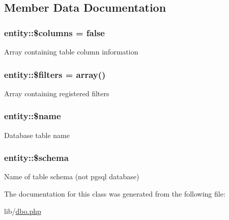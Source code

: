 \subsection{Member Data Documentation}
\hypertarget{classentity_a4d04649f2fb9b66924ce6a0f23633541}{}
\subsubsection[{\$columns}]{\setlength{\rightskip}{0pt plus 5cm}entity\+::\$columns = false}\label{classentity_a4d04649f2fb9b66924ce6a0f23633541}
Array containing table column information \hypertarget{classentity_a59f264aa884262d60bf96c1b750ffba8}{}
\subsubsection[{\$filters}]{\setlength{\rightskip}{0pt plus 5cm}entity\+::\$filters = array()}\label{classentity_a59f264aa884262d60bf96c1b750ffba8}
Array containing registered filters \hypertarget{classentity_ae35f24992703a71e751ed6afa981380f}{}
\subsubsection[{\$name}]{\setlength{\rightskip}{0pt plus 5cm}entity\+::\$name}\label{classentity_ae35f24992703a71e751ed6afa981380f}
Database table name \hypertarget{classentity_a8ce4fa273c17d68fff1dd173a704b109}{}
\subsubsection[{\$schema}]{\setlength{\rightskip}{0pt plus 5cm}entity\+::\$schema}\label{classentity_a8ce4fa273c17d68fff1dd173a704b109}
Name of table schema (not pgsql database) 

The documentation for this class was generated from the following file\+:\begin{DoxyCompactItemize}
\item 
lib/\hyperlink{dbo_8php}{dbo.\+php}\end{DoxyCompactItemize}
